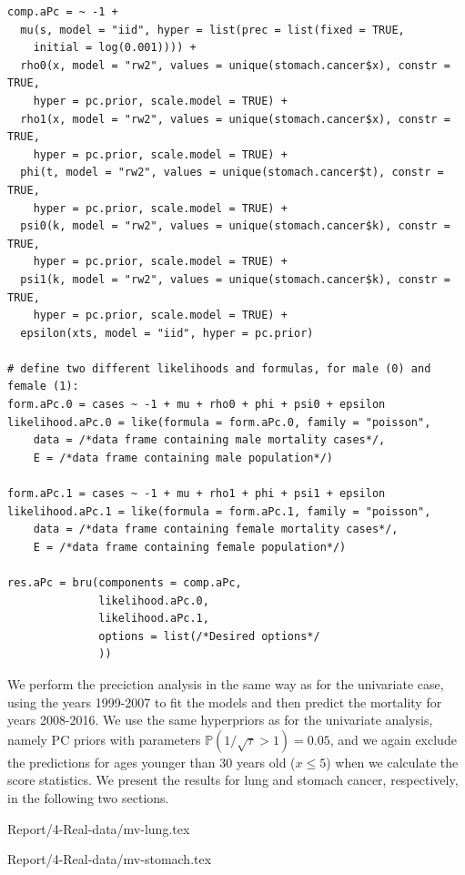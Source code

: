 \begin{verbatim}
comp.aPc = ~ -1 + 
  mu(s, model = "iid", hyper = list(prec = list(fixed = TRUE,
    initial = log(0.001)))) +
  rho0(x, model = "rw2", values = unique(stomach.cancer$x), constr = TRUE,
    hyper = pc.prior, scale.model = TRUE) + 
  rho1(x, model = "rw2", values = unique(stomach.cancer$x), constr = TRUE,
    hyper = pc.prior, scale.model = TRUE) + 
  phi(t, model = "rw2", values = unique(stomach.cancer$t), constr = TRUE,
    hyper = pc.prior, scale.model = TRUE) + 
  psi0(k, model = "rw2", values = unique(stomach.cancer$k), constr = TRUE,
    hyper = pc.prior, scale.model = TRUE) + 
  psi1(k, model = "rw2", values = unique(stomach.cancer$k), constr = TRUE,
    hyper = pc.prior, scale.model = TRUE) + 
  epsilon(xts, model = "iid", hyper = pc.prior)

# define two different likelihoods and formulas, for male (0) and female (1):
form.aPc.0 = cases ~ -1 + mu + rho0 + phi + psi0 + epsilon
likelihood.aPc.0 = like(formula = form.aPc.0, family = "poisson",
    data = /*data frame containing male mortality cases*/,
    E = /*data frame containing male population*/)

form.aPc.1 = cases ~ -1 + mu + rho1 + phi + psi1 + epsilon
likelihood.aPc.1 = like(formula = form.aPc.1, family = "poisson",
    data = /*data frame containing female mortality cases*/,
    E = /*data frame containing female population*/)

res.aPc = bru(components = comp.aPc,
              likelihood.aPc.0,
              likelihood.aPc.1,
              options = list(/*Desired options*/
              )) 
\end{verbatim}
\newpar We perform the preciction analysis in the same way as for the univariate case, using the years 1999-2007 to fit the models and then predict the mortality for years 2008-2016. We use the same hyperpriors as for the univariate analysis, namely PC priors with parameters $\mathbb{P}(1/\sqrt{\tau} > 1) = 0.05$, and we again exclude the predictions for ages younger than 30 years old ($x \leq 5$) when we calculate the score statistics. We present the results for lung and stomach cancer, respectively, in the following two sections.

{Report/4-Real-data/mv-lung.tex}

{Report/4-Real-data/mv-stomach.tex}

\newpage
